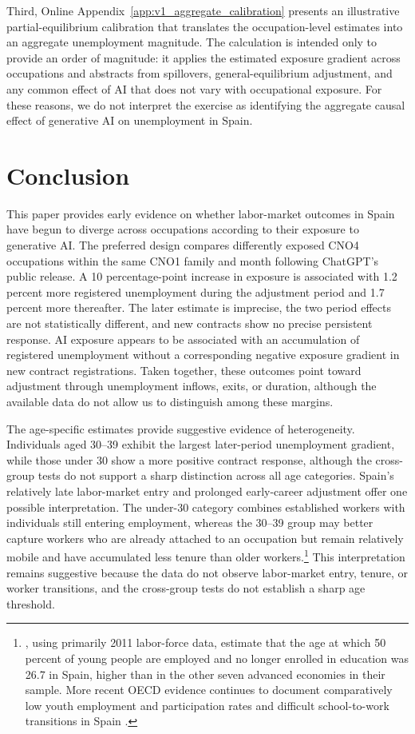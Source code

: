 \documentclass[11pt]{article}
\begin{document}
Third, Online Appendix~\ref{app:v1_aggregate_calibration} presents an illustrative partial-equilibrium calibration that translates the occupation-level estimates into an aggregate unemployment magnitude. The calculation is intended only to provide an order of magnitude: it applies the estimated exposure gradient across occupations and abstracts from spillovers, general-equilibrium adjustment, and any common effect of AI that does not vary with occupational exposure. For these reasons, we do not interpret the exercise as identifying the aggregate causal effect of generative AI on unemployment in Spain.

\section{Conclusion}
\label{sec:conclusion}

This paper provides early evidence on whether labor-market outcomes in Spain have begun to diverge across occupations according to their exposure to generative AI. The preferred design compares differently exposed CNO4 occupations within the same CNO1 family and month following ChatGPT's public release. A 10 percentage-point increase in exposure is associated with 1.2 percent more registered unemployment during the adjustment period and 1.7 percent more thereafter. The later estimate is imprecise, the two period effects are not statistically different, and new contracts show no precise persistent response. AI exposure appears to be associated with an accumulation of registered unemployment without a corresponding negative exposure gradient in new contract registrations. Taken together, these outcomes point toward adjustment through unemployment inflows, exits, or duration, although the available data do not allow us to distinguish among these margins.

The age-specific estimates provide suggestive evidence of heterogeneity. Individuals aged 30--39 exhibit the largest later-period unemployment gradient, while those under 30 show a more positive contract response, although the cross-group tests do not support a sharp distinction across all age categories. Spain's relatively late labor-market entry and prolonged early-career adjustment offer one possible interpretation. The under-30 category combines established workers with individuals still entering employment, whereas the 30--39 group may better capture workers who are already attached to an occupation but remain relatively mobile and have accumulated less tenure than older workers.\footnote{\citet{quintini_martin_2014}, using primarily 2011 labor-force data, estimate that the age at which 50 percent of young people are employed and no longer enrolled in education was 26.7 in Spain, higher than in the other seven advanced economies in their sample. More recent OECD evidence continues to document comparatively low youth employment and participation rates and difficult school-to-work transitions in Spain \citep{oecd_spain_2023}.} This interpretation remains suggestive because the data do not observe labor-market entry, tenure, or worker transitions, and the cross-group tests do not establish a sharp age threshold.
\end{document}
